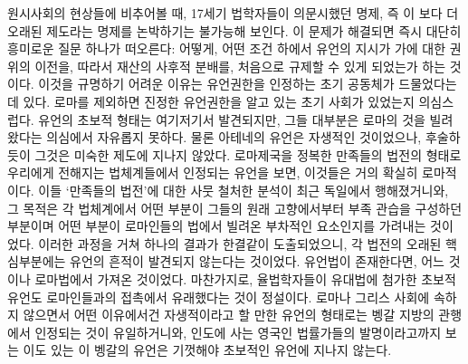 원시사회의 현상들에 비추어볼 때,
17세기 법학자들이 의문시했던 명제, 즉
이 보다 더 오래된 제도라는 명제를
논박하기는 불가능해 보인다.
이 문제가 해결되면 즉시 대단히 흥미로운 질문 하나가 떠오른다:
어떻게, 어떤 조건 하에서
유언의 지시가
가에 대한 권위의 이전을,
따라서 재산의 사후적 분배를,
처음으로 규제할 수 있게 되었는가 하는 것이다.
이것을 규명하기 어려운 이유는
유언권한을 인정하는 초기 공동체가 드물었다는 데 있다.
로마를 제외하면 진정한 유언권한을 알고 있는 초기 사회가 있었는지 의심스럽다.
유언의 초보적 형태는 여기저기서 발견되지만,
그들 대부분은 로마의 것을 빌려왔다는 의심에서 자유롭지 못하다.
물론 아테네의 유언은 자생적인 것이었으나,
후술하듯이 그것은 미숙한 제도에 지나지 않았다.
로마제국을 정복한 만족들의 법전의 형태로 우리에게 전해지는
법체계들에서 인정되는 유언을 보면, 이것들은 거의 확실히 로마적이다.
%
이들 `만족들의 법전'에 대한
사뭇 철처한 분석이 최근 독일에서 행해졌거니와,
그 목적은 각 법체계에서 어떤 부분이
그들의 원래 고향에서부터 부족 관습을 구성하던 부분이며
어떤 부분이 로마인들의 법에서 빌려온 부차적인 요소인지를
가려내는 것이었다.
이러한 과정을 거쳐 하나의 결과가 한결같이 도출되었으니,
각 법전의 오래된 핵심부분에는 유언의 흔적이 발견되지 않는다는 것이었다.
유언법이 존재한다면, 어느 것이나 로마법에서 가져온 것이었다.
마찬가지로,  율법학자들이 유대법에 첨가한
초보적 유언도 로마인들과의 접촉에서 유래했다는 것이 정설이다.
로마나 그리스 사회에 속하지 않으면서
어떤 이유에서건 자생적이라고 할 만한 유언의 형태로는
벵갈 지방의 관행에서 인정되는 것이 유일하거니와,
인도에 사는 영국인 법률가들의 발명이라고까지 보는 이도 있는
이 벵갈의 유언은
기껏해야 초보적인 유언에 지나지 않는다.

